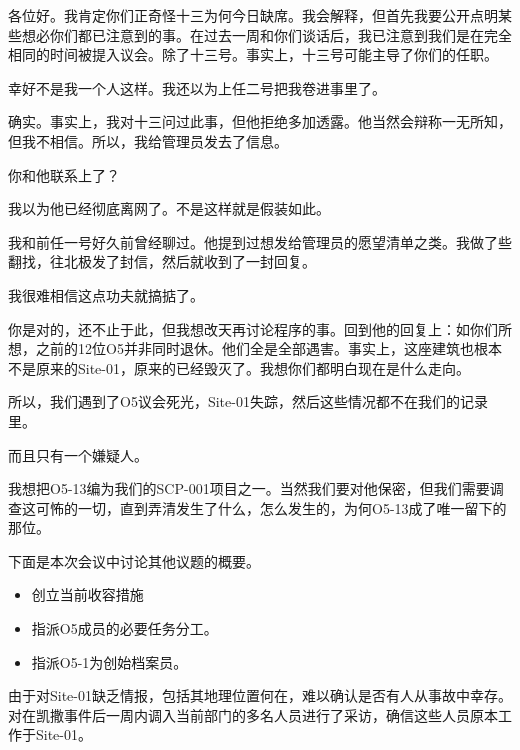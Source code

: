 \begin{scpbox}

各位好。我肯定你们正奇怪十三为何今日缺席。我会解释，但首先我要公开点明某些想必你们都已注意到的事。在过去一周和你们谈话后，我已注意到我们是在完全相同的时间被提入议会。除了十三号。事实上，十三号可能主导了你们的任职。


幸好不是我一个人这样。我还以为上任二号把我卷进事里了。

确实。事实上，我对十三问过此事，但他拒绝多加透露。他当然会辩称一无所知，但我不相信。所以，我给管理员发去了信息。

你和他联系上了？

我以为他已经彻底离网了。不是这样就是假装如此。

我和前任一号好久前曾经聊过。他提到过想发给管理员的愿望清单之类。我做了些翻找，往北极发了封信，然后就收到了一封回复。

我很难相信这点功夫就搞掂了。

你是对的，还不止于此，但我想改天再讨论程序的事。回到他的回复上：如你们所想，之前的12位O5并非同时退休。他们全是全部遇害。事实上，这座建筑也根本不是原来的Site-01，原来的已经毁灭了。我想你们都明白现在是什么走向。

所以，我们遇到了O5议会死光，Site-01失踪，然后这些情况都不在我们的记录里。

而且只有一个嫌疑人。

我想把O5-13编为我们的SCP-001项目之一。当然我们要对他保密，但我们需要调查这可怖的一切，直到弄清发生了什么，怎么发生的，为何O5-13成了唯一留下的那位。

\end{scpbox}

下面是本次会议中讨论其他议题的概要。

\begin{itemize}
\item 创立当前收容措施
\item 指派O5成员的必要任务分工。
\item 指派O5-1为创始档案员。
\end{itemize}



由于对Site-01缺乏情报，包括其地理位置何在，难以确认是否有人从事故中幸存。对在凯撒事件后一周内调入当前部门的多名人员进行了采访，确信这些人员原本工作于Site-01。

